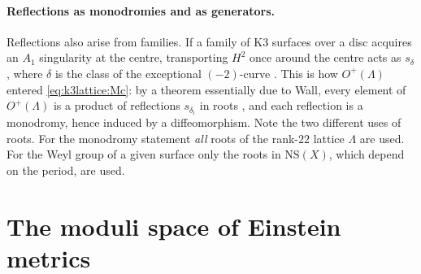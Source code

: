 \paragraph{Reflections as monodromies and as generators.} Reflections also arise from
families. If a family of K3 surfaces over a disc acquires an $A_1$ singularity at the centre,
transporting $H^2$ once around the centre acts as $s_\delta$, where $\delta$ is the class of
the exceptional $(-2)$-curve . This is how
$O^+(\Lambda)$ entered \eqref{eq:k3lattice:Mc}: by a theorem essentially due to Wall, every
element of $O^+(\Lambda)$ is a product of reflections $s_{\delta_i}$ in roots
, and each reflection is a monodromy, hence induced
by a diffeomorphism. Note the two different uses of roots. For the monodromy statement
\emph{all} roots of the rank-$22$ lattice $\Lambda$ are used. For the Weyl group of a given
surface only the roots in $\mathrm{NS}(X)$, which depend on the period, are used.

\section{The moduli space of Einstein metrics}\label{sec:k3lattice:einstein}

